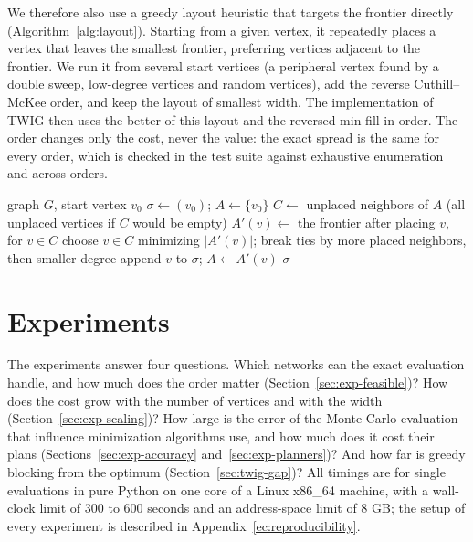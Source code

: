 \documentclass[preprint,11pt]{elsarticle}
\theoremstyle{definition}
\theoremstyle{remark}
\begin{document}
We therefore also use a greedy layout heuristic that targets the frontier directly (Algorithm~\ref{alg:layout}). Starting from a given vertex, it repeatedly places a vertex that leaves the smallest frontier, preferring vertices adjacent to the frontier. We run it from several start vertices (a peripheral vertex found by a double sweep, low-degree vertices and random vertices), add the reverse Cuthill--McKee order, and keep the layout of smallest width. The implementation of TWIG then uses the better of this layout and the reversed min-fill-in order. The order changes only the cost, never the value: the exact spread is the same for every order, which is checked in the test suite against exhaustive enumeration and across orders.

\begin{algorithm}[h]
\caption{Greedy frontier layout from a start vertex $v_0$}\label{alg:layout}
\begin{algorithmic}[1]
\Require graph $G$, start vertex $v_0$
\State $\sigma\gets(v_0)$; $A\gets\{v_0\}$ 
  \State $C\gets$ unplaced neighbors of $A$ (all unplaced vertices if $C$ would be empty)
  \State $A'(v)\gets$ the frontier after placing $v$, for $v\in C$
  \State choose $v\in C$ minimizing $|A'(v)|$; break ties by more placed neighbors, then smaller degree
  \State append $v$ to $\sigma$; $A\gets A'(v)$
\EndWhile
\State \Return $\sigma$
\end{algorithmic}
\end{algorithm}

\section{Experiments}\label{sec:twig-empirical}

The experiments answer four questions. Which networks can the exact evaluation handle, and how much does the order matter (Section~\ref{sec:exp-feasible})? How does the cost grow with the number of vertices and with the width (Section~\ref{sec:exp-scaling})? How large is the error of the Monte Carlo evaluation that influence minimization algorithms use, and how much does it cost their plans (Sections~\ref{sec:exp-accuracy} and~\ref{sec:exp-planners})? And how far is greedy blocking from the optimum (Section~\ref{sec:twig-gap})? All timings are for single evaluations in pure Python on one core of a Linux x86\_64 machine, with a wall-clock limit of $300$ to $600$ seconds and an address-space limit of $8$ GB; the setup of every experiment is described in Appendix~\ref{ec:reproducibility}.
\end{document}

